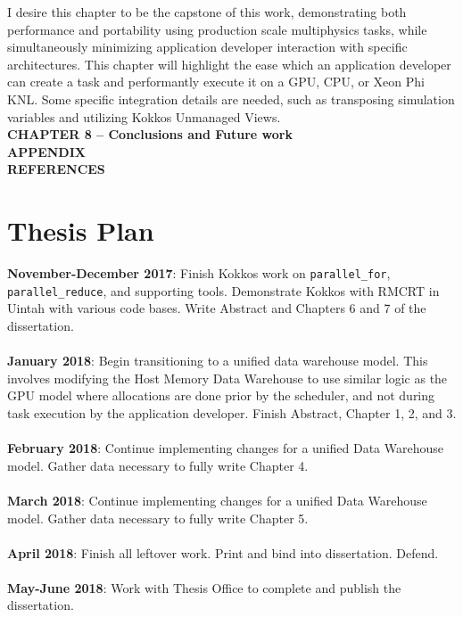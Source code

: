 \documentclass[12pt]{article}
\begin{document}
I desire this chapter to be the capstone of this work, demonstrating both performance and portability using production scale multiphysics tasks, while simultaneously minimizing application developer interaction with specific architectures.  This chapter will highlight the ease which an application developer can create a task and performantly execute it on a GPU, CPU, or Xeon Phi KNL.  Some specific integration details are needed, such as transposing simulation variables and utilizing Kokkos Unmanaged Views.\\  
\textbf{CHAPTER 8 – Conclusions and Future work}\\
\textbf{APPENDIX}\\
\textbf{REFERENCES}\\

\section{Thesis Plan}
\label{ch:thesis_plan}

\textbf{November-December 2017}: Finish Kokkos work on \texttt{parallel\_for}, \texttt{parallel\_reduce}, and supporting tools.  Demonstrate Kokkos with RMCRT in Uintah with various code bases.  Write Abstract and Chapters 6 and 7 of the dissertation.\\
\\
\textbf{January 2018}: Begin transitioning to a unified data warehouse model.  This involves modifying the Host Memory Data Warehouse to use similar logic as the GPU model where allocations are done prior by the scheduler, and not during task execution by the application developer.  Finish Abstract, Chapter 1, 2, and 3.\\
\\
\textbf{February 2018}: Continue implementing changes for a unified Data Warehouse model.  Gather data necessary to fully write Chapter 4.\\
\\
\textbf{March 2018}: Continue implementing changes for a unified Data Warehouse model.  Gather data necessary to fully write Chapter 5.  \\
\\
\textbf{April 2018}: Finish all leftover work.  Print and bind into dissertation.  Defend. \\
\\
\textbf{May-June 2018}: Work with Thesis Office to complete and publish the dissertation. \\
\end{document}

